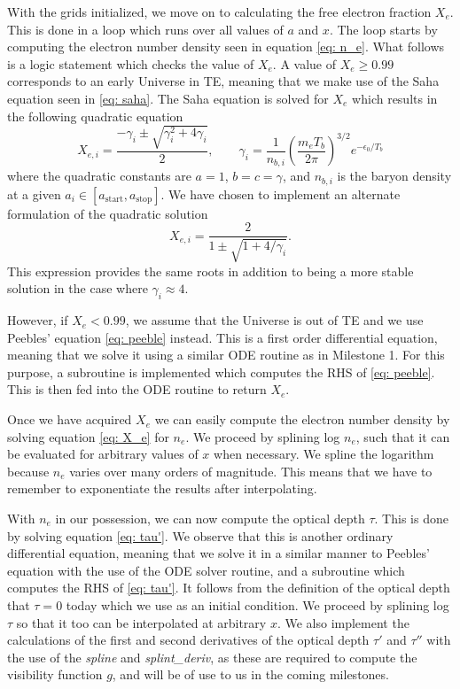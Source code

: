 \documentclass[a4paper, 10pt, reqno]{amsart}
\begin{document}
With the grids initialized, we move on to calculating the free electron
fraction $X_e$. This is done in a loop which runs over all values of $a$ and
$x$. The loop starts by computing the electron number density seen in equation
\eqref{eq: n_e}. What follows is a logic statement which checks the value of
$X_e$. A value of $X_e \geq 0.99$ corresponds to an early Universe in TE,
meaning that we make use of the Saha equation seen in \eqref{eq: saha}. The
Saha equation is solved for $X_e$ which results in the following quadratic
equation
\begin{equation}\label{eq: quad}
    X_{e,i} = \frac{-\gamma_i \pm \sqrt{\gamma_i^2 + 4\gamma_i}}{2}, \qquad
    \gamma_i = \frac{1}{n_{b,i}}\left(\frac{m_e T_b}{2\pi}\right)^{3/2}
    e^{-\epsilon_0/T_b}
\end{equation}
where the quadratic constants are $a = 1$, $b = c = \gamma$, and $n_{b,i}$ is
the baryon density at a given $a_i \in [a_\mathrm{start}, a_\mathrm{stop}]$.
We have chosen to implement an alternate formulation of the quadratic solution
\begin{equation}\label{eq: quad2}
    X_{e,i} = \frac{2}{1 \pm \sqrt{1 + 4/\gamma_i}}. 
\end{equation}
This expression provides the same roots in addition to being a more stable
solution in the case where $\gamma_i \approx 4$. 

However, if $X_e < 0.99$, we assume that the Universe is out of TE and we use
Peebles' equation \eqref{eq: peeble} instead. This is a first order
differential equation, meaning that we solve it using a similar ODE routine as
in Milestone 1. For this purpose, a subroutine is implemented which computes
the RHS of \eqref{eq: peeble}. This is then fed into the ODE routine to return
$X_e$.

Once we have acquired $X_e$ we can easily compute the electron number density
by solving equation \eqref{eq: X_e} for $n_e$. We proceed by splining log
$n_e$, such that it can be evaluated for arbitrary values of $x$ when
necessary. We spline the logarithm because $n_e$ varies over many orders of
magnitude. This means that we have to remember to exponentiate the results
after interpolating. 

With $n_e$ in our possession, we can now compute the optical depth $\tau$.
This is done by solving equation \eqref{eq: tau'}. We observe that this is
another ordinary differential equation, meaning that we solve it in a similar
manner to Peebles' equation with the use of the ODE solver routine, and a
subroutine which computes the RHS of \eqref{eq: tau'}. It follows from the
definition of the optical depth that $\tau = 0$ today which we use as an
initial condition. We proceed by splining log $\tau$ so that it too can be
interpolated at arbitrary $x$. We also implement the calculations of the first
and second derivatives of the optical depth $\tau'$ and $\tau''$ with the use
of the \textit{spline} and \textit{splint\_deriv}, as these are required to
compute the visibility function $g$, and will be of use to us in the coming
milestones.
\end{document}
